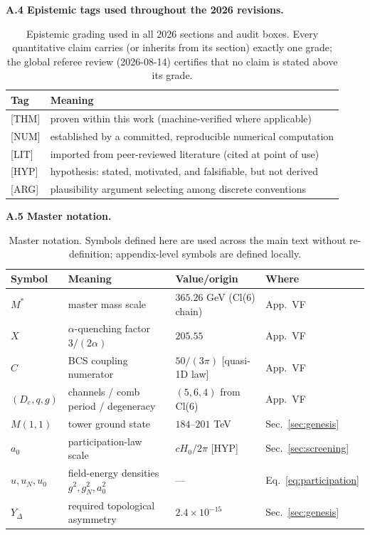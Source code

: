 \documentclass[a4paper,12pt]{article}
\begin{document}
\textbf{A.4 Epistemic tags used throughout the 2026 revisions.}
\begin{table}[H]
\centering
\small
\begin{tabular}{ll}
\toprule
\textbf{Tag} & \textbf{Meaning} \\
\midrule
{[THM]} & proven within this work (machine-verified where applicable) \\
{[NUM]} & established by a committed, reproducible numerical computation \\
{[LIT]} & imported from peer-reviewed literature (cited at point of use) \\
{[HYP]} & hypothesis: stated, motivated, and falsifiable, but not derived \\
{[ARG]} & plausibility argument selecting among discrete conventions \\
\bottomrule
\end{tabular}
\caption{Epistemic grading used in all 2026 sections and audit boxes. Every
quantitative claim carries (or inherits from its section) exactly one grade;
the global referee review (2026-08-14) certifies that no claim is stated above
its grade.}
\end{table}

\textbf{A.5 Master notation.}
\begin{table}[H]
\centering
\small
\begin{tabular}{llll}
\toprule
\textbf{Symbol} & \textbf{Meaning} & \textbf{Value/origin} & \textbf{Where} \\
\midrule
$M^*$ & master mass scale & $365.26$ GeV (Cl(6) chain) & App.~VF \\
$X$ & $\alpha$-quenching factor $3/(2\alpha)$ & $205.55$ & App.~VF \\
$C$ & BCS coupling numerator & $50/(3\pi)$ [quasi-1D law] & App.~VF \\
$(D_e, q, g)$ & channels / comb period / degeneracy & $(5, 6, 4)$ from Cl(6) & App.~VF \\
$M(1,1)$ & tower ground state & $184$--$201$ TeV & Sec.~\ref{sec:genesis} \\
$a_0$ & participation-law scale & $cH_0/2\pi$ [HYP] & Sec.~\ref{sec:screening} \\
$u, u_N, u_0$ & field-energy densities $g^2, g_N^2, a_0^2$ & --- & Eq.~\ref{eq:participation} \\
$Y_\Delta$ & required topological asymmetry & $2.4\times10^{-15}$ & Sec.~\ref{sec:genesis} \\
\bottomrule
\end{tabular}
\caption{Master notation. Symbols defined here are used across the main text
without re-definition; appendix-level symbols are defined locally.}
\end{table}
\end{document}

